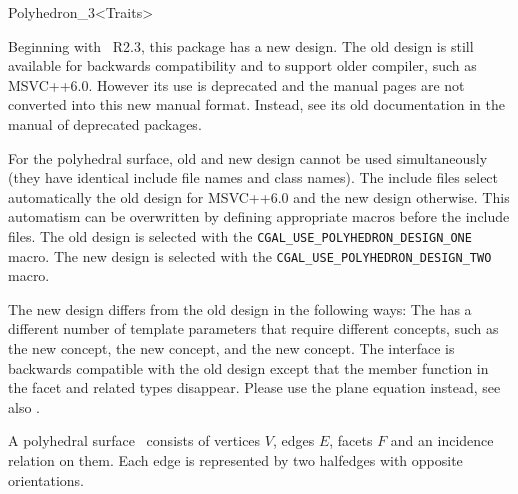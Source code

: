 
\ccRefPageBegin



\begin{ccRefClass}{Polyhedron_3<Traits>}


Beginning with \cgal\ R2.3, this package has a new design.  The old
design is still available for backwards compatibility and to support
older compiler, such as MSVC++6.0. However its use is deprecated and
the manual pages are not converted into this new manual
format. Instead, see its old documentation in the manual of 
deprecated packages.

For the polyhedral surface, old and new design cannot be used
simultaneously (they have identical include file names and class
names). The include files select automatically the old design for
MSVC++6.0 and the new design otherwise. This automatism can be
overwritten by defining appropriate macros before the include
files. The old design is selected with the 
\texttt{CGAL\_USE\_POLYHEDRON\_DESIGN\_ONE} macro. The new design 
is selected with the 
\texttt{CGAL\_USE\_POLYHEDRON\_DESIGN\_TWO} macro.

The new design differs from the old design in the following ways: The
 has a different number of template parameters that
require different concepts, such as the new  concept,
the new  concept, and the new
 concept. The  interface is
backwards compatible with the old design except that the
 member function in the facet and related types disappear.
Please use the plane equation instead, see also
.

\ccDefinition
  
A polyhedral surface \ccClassTemplateName\ consists of vertices $V$,
edges $E$, facets $F$ and an incidence relation on them.  Each edge is
represented by two halfedges with opposite orientations.


\end{ccRefClass}
